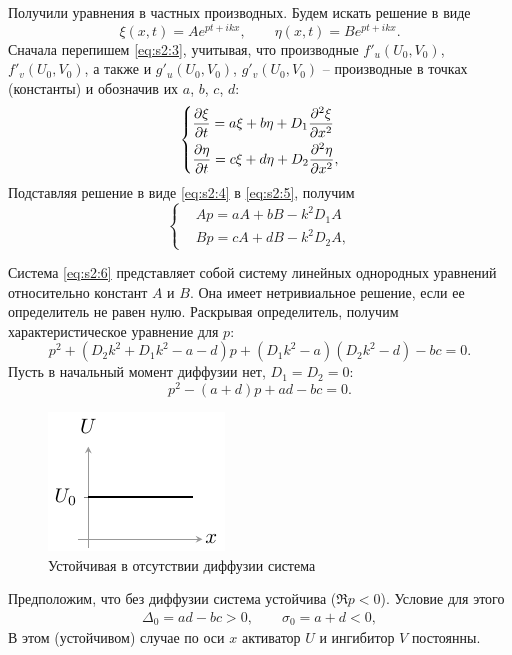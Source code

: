 Получили уравнения в частных производных. Будем искать решение в виде
\begin{equation}
	\xi(x,t)=A e^{pt+ikx}, \qquad \eta(x,t)=B e^{pt+ikx}.
	\label{eq:s2:4}
\end{equation}
Сначала перепишем  \eqref{eq:s2:3}, учитывая, что  производные $f'_u(U_0,V_0)$, $f'_v(U_0,V_0)$, а также и $g'_u(U_0,V_0)$, $g'_v(U_0,V_0)$ -- производные в точках (константы) и обозначив их $a$, $b$, $c$, $d$: 
\begin{equation}
	\left\{\begin{aligned}
		&\pdv{\xi}{t}=a\xi+b\eta+D_1 \pdv[2]{\xi}{x} \\
		&\pdv{\eta}{t}=c\xi+d\eta+D_2 \pdv[2]{\eta}{x},
	\end{aligned}\right.
	\label{eq:s2:5}
\end{equation}
Подставляя решение в виде \eqref{eq:s2:4} в \eqref{eq:s2:5}, получим
\begin{equation}
	\left\{\begin{aligned}
		&Ap=aA+bB-k^2 D_1A\\
		&Bp=cA+dB-k^2 D_2A,
	\end{aligned}\right.
	\label{eq:s2:6}
\end{equation}

Система \eqref{eq:s2:6} представляет собой систему линейных однородных уравнений относительно констант $A$ и  $B$. Она имеет нетривиальное решение, если ее определитель не равен нулю. Раскрывая определитель, получим характеристическое уравнение для $p$:
\begin{equation}
	p^2+(D_2k^2+D_1k^2-a-d)p+(D_1k^2-a)(D_2k^2-d)-bc=0.
	\label{eq:s2:7}
\end{equation}
Пусть в начальный момент диффузии нет, $D_1=D_2=0$:
\begin{equation}
	p^2-(a+d)p+ad-bc=0.
	\label{eq:s2:8}
\end{equation}
\begin{figure}[H]
	\centering
	\includegraphics[scale=1.5]{img/diffusion_instability/static_u} 
	\caption{Устойчивая в отсутствии диффузии система}
\end{figure}
Предположим, что без диффузии система устойчива ($\Re p < 0$). Условие для этого
\begin{gather}
	\Delta_0=ad-bc>0, \qquad \sigma_0=a+d<0,
	\label{eq:s2:9}
\end{gather}
В этом (устойчивом) случае по оси $x$ активатор $U$ и ингибитор $V$ постоянны. 

